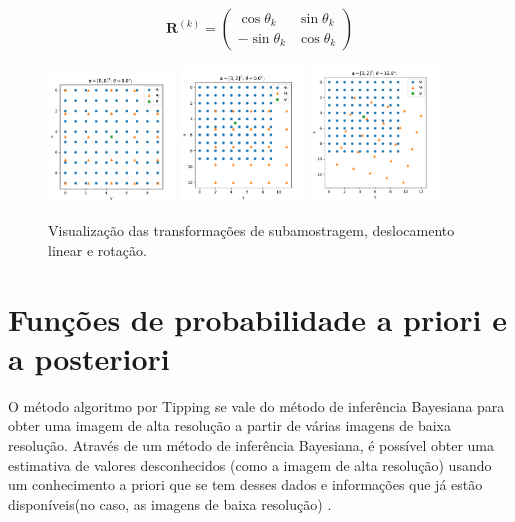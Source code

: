 \documentclass[12pt,openright,oneside,a4paper,english,brazil]{abntex2}
\begin{document}
\begin{equation}
	\mathbf{R}^{(k)} = 
	\begin{pmatrix}
		\cos \theta_k & \sin \theta_k \\
		- \sin \theta_k & \cos \theta_k
	\end{pmatrix}
\end{equation}

\begin{figure}
	\centering
	\includegraphics[width=0.3\textwidth]{./figures/transform1.pdf}
	\includegraphics[width=0.3\textwidth]{./figures/transform2.pdf}
	\includegraphics[width=0.3\textwidth]{./figures/transform3.pdf}
	\caption{Visualização das transformações de subamostragem, deslocamento linear e rotação.}
	\label{fig:transformations}
\end{figure}


\section{Funções de probabilidade a priori e a posteriori}

O método algoritmo por Tipping se vale do método de inferência Bayesiana para obter uma imagem de alta resolução a partir de várias imagens de baixa resolução.
Através de um método de inferência Bayesiana, é possível obter uma estimativa de valores desconhecidos (como a imagem de alta resolução) usando um conhecimento a priori que se tem desses dados e informações que já estão disponíveis(no caso, as imagens de baixa resolução) \cite{therrien2011probability}.
\end{document}
